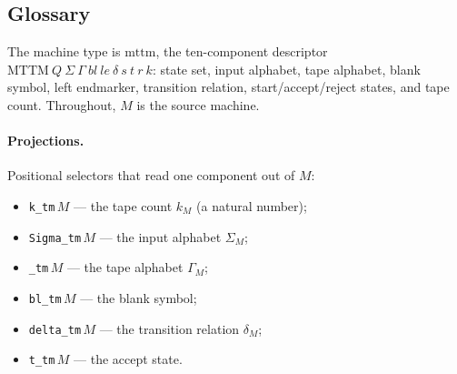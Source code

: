 \subsection{Glossary}

The machine type is $\mathrm{mttm}$, the ten-component descriptor
$\mathrm{MTTM}\ Q\ \Sigma\ \Gamma\ bl\ le\ \delta\ s\ t\ r\ k$: state
set, input alphabet, tape alphabet, blank symbol, left endmarker,
transition relation, start/accept/reject states, and tape count.
Throughout, $M$ is the source machine.

\paragraph{Projections.}  Positional selectors that read one component
out of $M$:
\begin{itemize}
\item \texttt{k\_tm}\,$M$ --- the tape count $k_M$ (a natural number);
\item \texttt{Sigma\_tm}\,$M$ --- the input alphabet $\Sigma_M$;
\item \texttt{\isasymGamma\_tm}\,$M$ --- the tape alphabet $\Gamma_M$;
\item \texttt{bl\_tm}\,$M$ --- the blank symbol;
\item \texttt{delta\_tm}\,$M$ --- the transition relation $\delta_M$;
\item \texttt{t\_tm}\,$M$ --- the accept state.
\end{itemize}

